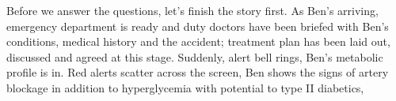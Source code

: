 Before we answer the questions, let's finish the story first. As Ben's arriving, emergency department is ready and duty doctors have been briefed with Ben's conditions, medical history and the accident; treatment plan has been laid out, discussed and agreed at this stage. Suddenly, alert bell rings, Ben's metabolic profile is in. Red alerts scatter across the screen, Ben shows the signs of artery blockage in addition to hyperglycemia with potential to type II diabetics, 